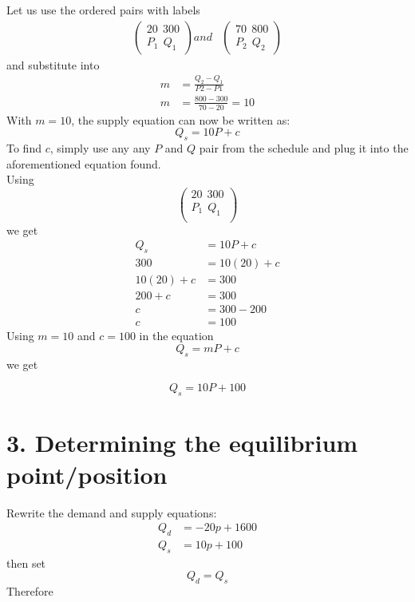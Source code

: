 \documentclass[table]{article}
\begin{document}
    Let us use the ordered pairs with labels
    $$
        \begin{aligned}
            \begin{pmatrix}
                20 \ \ 300 \\
                P_1 \ \ Q_1
            \end{pmatrix} and &
            \begin{pmatrix}
                70 \ \ 800 \\
                P_2 \ \ Q_2
            \end{pmatrix}
        \end{aligned}
    $$
    and substitute into
    $$
        \begin{aligned}
            m & = \frac{Q_2 - Q_1}{P2-P1}      \\
            m & = \frac{800 - 300}{70-20} = 10
        \end{aligned}
    $$
    With $m=10$, the supply equation can now be written as:
    $$
        Q_s = 10P + c
    $$
    To find $c$, simply use any any $P$ and $Q$ pair from the schedule and plug it into the aforementioned equation found.
    \\Using
    $$
        \begin{pmatrix}
            20 \ \ 300  \\
            P_1 \ \ Q_1 \\
        \end{pmatrix}
    $$
    we get
    $$
        \begin{aligned}
            Q_s        & = 10P + c   \\
            300        & = 10(20)+c  \\
            10(20) + c & = 300       \\
            200 + c    & = 300       \\
            c          & = 300 - 200 \\
            c          & = 100
        \end{aligned}
    $$
    Using $m=10$ and $c=100$ in the equation
    $$
        Q_s = mP + c
    $$
    we get

    $$
        Q_s = 10P + 100
    $$

    \section*{3. Determining the equilibrium point/position}

    Rewrite the demand and supply equations:
    $$
        \begin{aligned}
            Q_d & = -20p + 1600 \\
            Q_s & = 10p + 100
        \end{aligned}
    $$
    then set $$Q_d = Q_s$$
    Therefore
\end{document}
